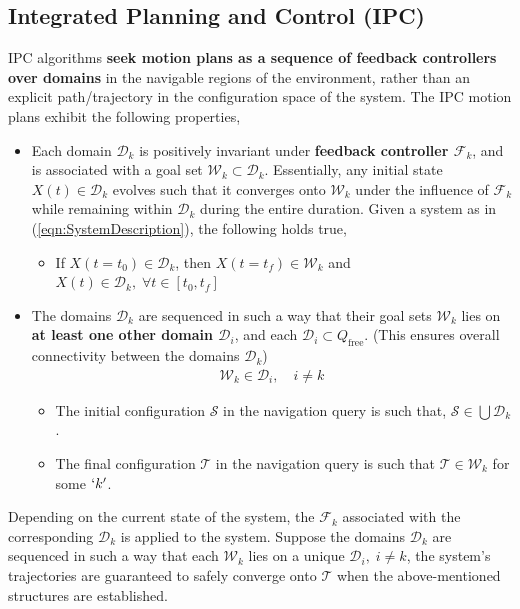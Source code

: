 \documentclass{article}
\begin{document}
\subsection{Integrated Planning and Control (IPC)}
IPC algorithms \textbf{seek motion plans as a sequence of feedback controllers over domains} in the navigable regions of the environment, rather than an explicit path/trajectory in the configuration space of the system. The IPC motion plans exhibit the following properties,
\begin{itemize}
    \item Each domain $\mathcal{D}_k$ is positively invariant under \textbf{feedback controller $\mathcal{F}_k$}, and is associated with a goal set $\mathcal{W}_k \subset \mathcal{D}_k$. Essentially, any initial state $X(t)\in \mathcal{D}_k$ evolves such that it converges onto $\mathcal{W}_k$ under the influence of $\mathcal{F}_k$ while remaining within $\mathcal{D}_k$ during the entire duration. Given a system as in (\ref{eqn:SystemDescription}), the following holds true,
    \begin{itemize}
        \item If $X(t=t_0) \in \mathcal{D}_k$, then $X(t=t_f) \in \mathcal{W}_k$ and $X(t)\in \mathcal{D}_k, \;\forall t \in [t_0,t_f]$
    \end{itemize}
    \item The domains $\mathcal{D}_k$ are sequenced in such a way that their goal sets $\mathcal{W}_k$ lies on \textbf{at least one other domain $\mathcal{D}_i$}, and each $\mathcal{D}_i \subset{Q}_{\text{free}}$. (This ensures overall connectivity between the domains $\mathcal{D}_k$)
    \begin{align*}
        \mathcal{W}_k \in \mathcal{D}_i, \quad i \neq k
    \end{align*}
    \begin{itemize}
        \item The initial configuration $\mathcal{S}$ in the navigation query is such that, $\mathcal{S}\in \bigcup \mathcal{D}_k$.
        \item The final configuration $\mathcal{T}$ in the navigation query is such that $\mathcal{T} \in \mathcal{W}_k$ for some $`k'$.
    \end{itemize}
\end{itemize}
Depending on the current state of the system, the $\mathcal{F}_k$ associated with the corresponding $\mathcal{D}_k$ is applied to the system. Suppose the domains $\mathcal{D}_k$ are sequenced in such a way that each $\mathcal{W}_k$ lies on a unique $\mathcal{D}_i, \; i\neq k$, the system's trajectories are guaranteed to safely converge onto $\mathcal{T}$ when the above-mentioned structures are established.
\end{document}
